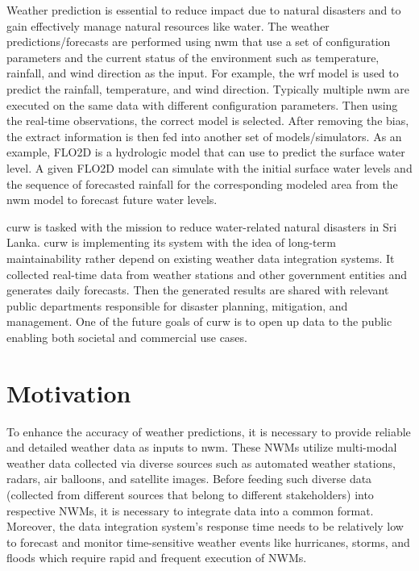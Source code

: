 Weather prediction is essential to reduce impact due to natural disasters and to gain effectively manage natural resources like water. The weather predictions/forecasts are performed using \acrfull{nwm} that use a set of configuration parameters and the current status of the environment such as temperature, rainfall, and wind direction as the input. For example, the \acrfull{wrf} \cite{MesoscaleMicroscaleMeteorologyLaboratoryWeatherModel} model is used to predict the rainfall, temperature, and wind direction. Typically multiple \acrshort{nwm} are executed on the same data with different configuration parameters. Then using the real-time observations, the correct model is selected. After removing the bias, the extract information is then fed into another set of models/simulators. 
As an example, FLO2D is a hydrologic model that can use to predict the surface water level. A given FLO2D model can simulate with the initial surface water levels and the sequence of forecasted rainfall for the corresponding modeled area from the \acrshort{nwm} model to forecast future water levels.

\acrfull{curw} \cite{CUrWSL2017SL} is tasked with the mission to reduce water-related natural disasters in Sri Lanka. \acrshort{curw} \cite{CUrWSLObservedSL} is implementing its system with the idea of long-term maintainability rather depend on existing weather data integration systems. It collected real-time data from weather stations and other government entities and generates daily forecasts. Then the generated results are shared with relevant public departments responsible for disaster planning, mitigation, and management. One of the future goals of \acrshort{curw} is to open up data to the public enabling both societal and commercial use cases.

\section{Motivation}
To enhance the accuracy of weather predictions, it is necessary to provide reliable and detailed weather data as inputs to \acrshort{nwm}. These NWMs utilize multi-modal weather data collected via diverse sources such as automated weather stations, radars, air balloons, and satellite images. Before feeding such diverse data (collected from different sources that belong to different stakeholders) into respective NWMs, it is necessary to integrate data into a common format. Moreover, the data integration system’s response time needs to be relatively low to forecast and monitor time-sensitive weather events like hurricanes, storms, and floods which require rapid and frequent execution of NWMs.

